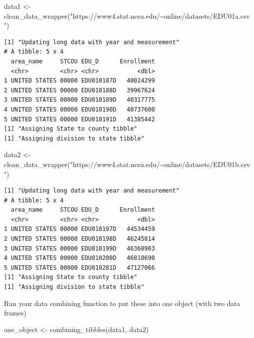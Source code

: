 \documentclass[
  letterpaper,
  DIV=11,
  numbers=noendperiod]{scrartcl}
\newenvironment{Shaded}{\begin{snugshade}}{\end{snugshade}}
\newcommand{\FunctionTok}[1]{\textcolor[rgb]{0.28,0.35,0.67}{#1}}
\newcommand{\NormalTok}[1]{\textcolor[rgb]{0.00,0.23,0.31}{#1}}
\newcommand{\OtherTok}[1]{\textcolor[rgb]{0.00,0.23,0.31}{#1}}
\newcommand{\StringTok}[1]{\textcolor[rgb]{0.13,0.47,0.30}{#1}}
\begin{document}
\begin{Shaded}
\begin{Highlighting}[]
\NormalTok{data1 }\OtherTok{\textless{}{-}} \FunctionTok{clean\_data\_wrapper}\NormalTok{(}\StringTok{"https://www4.stat.ncsu.edu/\textasciitilde{}online/datasets/EDU01a.csv"}\NormalTok{)}
\end{Highlighting}
\end{Shaded}

\begin{verbatim}
[1] "Updating long data with year and measurement"
# A tibble: 5 x 4
  area_name     STCOU EDU_D      Enrollment
  <chr>         <chr> <chr>           <dbl>
1 UNITED STATES 00000 EDU010187D   40024299
2 UNITED STATES 00000 EDU010188D   39967624
3 UNITED STATES 00000 EDU010189D   40317775
4 UNITED STATES 00000 EDU010190D   40737600
5 UNITED STATES 00000 EDU010191D   41385442
[1] "Assigning State to county tibble"
[1] "Assigning division to state tibble"
\end{verbatim}

\begin{Shaded}
\begin{Highlighting}[]
\NormalTok{data2 }\OtherTok{\textless{}{-}} \FunctionTok{clean\_data\_wrapper}\NormalTok{(}\StringTok{"https://www4.stat.ncsu.edu/\textasciitilde{}online/datasets/EDU01b.csv"}\NormalTok{)}
\end{Highlighting}
\end{Shaded}

\begin{verbatim}
[1] "Updating long data with year and measurement"
# A tibble: 5 x 4
  area_name     STCOU EDU_D      Enrollment
  <chr>         <chr> <chr>           <dbl>
1 UNITED STATES 00000 EDU010197D   44534459
2 UNITED STATES 00000 EDU010198D   46245814
3 UNITED STATES 00000 EDU010199D   46368903
4 UNITED STATES 00000 EDU010200D   46818690
5 UNITED STATES 00000 EDU010201D   47127066
[1] "Assigning State to county tibble"
[1] "Assigning division to state tibble"
\end{verbatim}

Run your data combining function to put these into one object (with two
data frames)

\begin{Shaded}
\begin{Highlighting}[]
\NormalTok{one\_object }\OtherTok{\textless{}{-}} \FunctionTok{combining\_tibbles}\NormalTok{(data1, data2)}
\end{Highlighting}
\end{Shaded}
\end{document}
